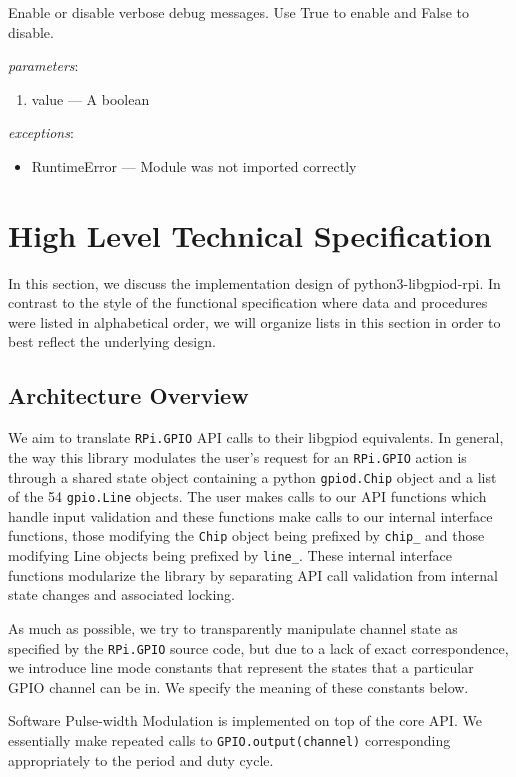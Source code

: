 \documentclass[12pt]{article}
\begin{document}
Enable or disable verbose debug messages. Use True to enable and False to disable.

\textit{parameters}:
\begin{enumerate}      
        \item value --- A boolean
\end{enumerate}
 

\textit{exceptions}:
\begin{itemize}
    \item RuntimeError --- Module was not imported correctly 
\end{itemize}

\section{High Level Technical Specification}

In this section, we discuss the implementation design of python3-libgpiod-rpi. In contrast to the style of the functional specification where data and procedures were listed in alphabetical order, we will organize lists in this section in order to best reflect the underlying design.

\subsection{Architecture Overview}

We aim to translate \texttt{RPi.GPIO} API calls to their libgpiod equivalents. In general, the way this library modulates the user's request for an \texttt{RPi.GPIO} action is through a shared state object containing a python \texttt{gpiod.Chip} object and a list of the 54 \texttt{gpio.Line} objects. The user makes calls to our API functions which handle input validation and these functions make calls to our internal interface functions, those modifying the \texttt{Chip} object being prefixed by \texttt{chip\_} and those modifying Line objects being prefixed by \texttt{line\_}. These internal interface functions modularize the library by separating API call validation from internal state changes and associated locking.

As much as possible, we try to transparently manipulate channel state as specified by the \texttt{RPi.GPIO} source code, but due to a lack of exact correspondence, we introduce line mode constants that represent the states that a particular GPIO channel can be in. We specify the meaning of these constants below.

Software Pulse-width Modulation is implemented on top of the core API.
We essentially make repeated calls to \texttt{GPIO.output(channel)} corresponding appropriately to the period and duty cycle.
\end{document}
